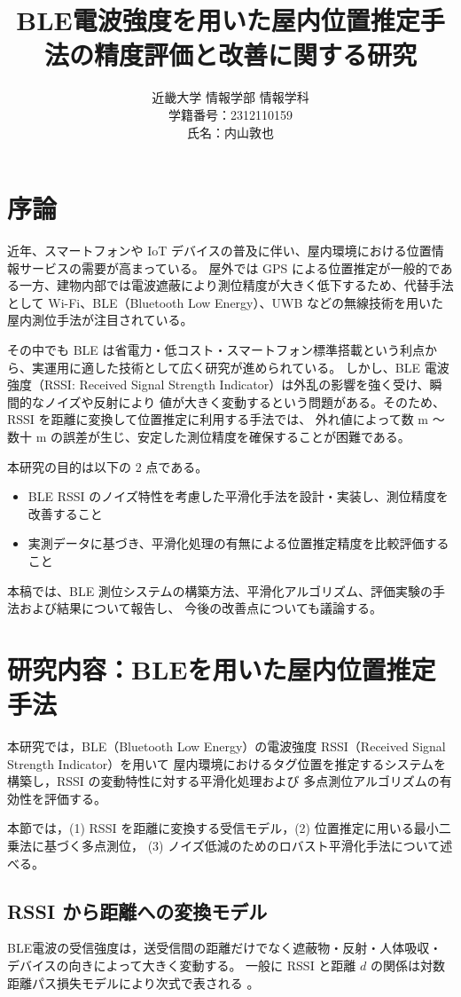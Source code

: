 \documentclass[a4paper,11pt,twocolumn]{article}
\title{%
BLE電波強度を用いた屋内位置推定手法の精度評価と改善に関する研究\\
\large
}
\author{%
近畿大学 情報学部 情報学科\\
学籍番号：2312110159\\
氏名：内山敦也
}
\date{}
\begin{document}
\maketitle

\section{序論}
近年、スマートフォンや IoT デバイスの普及に伴い、屋内環境における位置情報サービスの需要が高まっている。
屋外では GPS による位置推定が一般的である一方、建物内部では電波遮蔽により測位精度が大きく低下するため、代替手法として
Wi-Fi、BLE（Bluetooth Low Energy）、UWB などの無線技術を用いた屋内測位手法が注目されている。

その中でも BLE は省電力・低コスト・スマートフォン標準搭載という利点から、実運用に適した技術として広く研究が進められている。
しかし、BLE 電波強度（RSSI: Received Signal Strength Indicator）は外乱の影響を強く受け、瞬間的なノイズや反射により
値が大きく変動するという問題がある。そのため、RSSI を距離に変換して位置推定に利用する手法では、
外れ値によって数 m ～ 数十 m の誤差が生じ、安定した測位精度を確保することが困難である。

本研究の目的は以下の 2 点である。
\begin{itemize}
    \item BLE RSSI のノイズ特性を考慮した平滑化手法を設計・実装し、測位精度を改善すること
    \item 実測データに基づき、平滑化処理の有無による位置推定精度を比較評価すること
\end{itemize}

本稿では、BLE 測位システムの構築方法、平滑化アルゴリズム、評価実験の手法および結果について報告し、
今後の改善点についても議論する。

\section{研究内容：BLEを用いた屋内位置推定手法}
本研究では，BLE（Bluetooth Low Energy）の電波強度 RSSI（Received Signal Strength Indicator）を用いて
屋内環境におけるタグ位置を推定するシステムを構築し，RSSI の変動特性に対する平滑化処理および
多点測位アルゴリズムの有効性を評価する。

本節では，(1) RSSI を距離に変換する受信モデル，(2) 位置推定に用いる最小二乗法に基づく多点測位，
(3) ノイズ低減のためのロバスト平滑化手法について述べる。

\subsection{RSSI から距離への変換モデル}
BLE電波の受信強度は，送受信間の距離だけでなく遮蔽物・反射・人体吸収・デバイスの向きによって大きく変動する。
一般に RSSI と距離 $d$ の関係は対数距離パス損失モデルにより次式で表される \cite{shuang2017ipin}。
\end{document}
